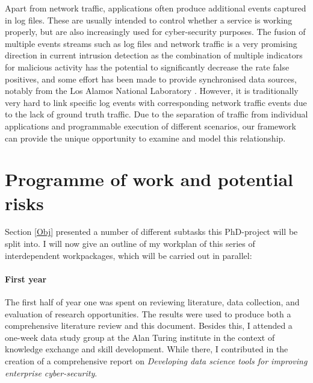 \documentclass[a4paper,12pt,twoside]{report}
\begin{document}
Apart from network traffic, applications often produce additional events captured in log files. These are usually intended to control whether a service is working properly, but are also increasingly used for cyber-security purposes. The fusion of multiple events streams such as log files and network traffic is a very promising direction in current intrusion detection as the combination of multiple indicators for malicious activity has the potential to significantly decrease the rate false positives, and some effort has been made to provide synchronised data sources, notably from the Los Alamos National Laboratory \cite{kent-2015-cyberdata1}. However, it is traditionally very hard to link specific log events with corresponding network traffic events due to the lack of ground truth traffic. Due to the separation of traffic from individual applications and programmable execution of different scenarios, our framework can provide the unique opportunity to examine and model this relationship. %


\chapter{Programme of work and potential risks}

Section \ref{Obj} presented a number of different subtasks this PhD-project will be split into. I will now give an outline of my workplan of this series of interdependent workpackages, which will be carried out in parallel:

\subsubsection{First year}

The first half of year one was spent on reviewing literature, data collection, and evaluation of research opportunities. The results were used to produce both a comprehensive literature review and this document. Besides this, I attended a one-week data study group at the Alan Turing institute in the context of knowledge exchange and skill development. While there, I contributed in the creation of a comprehensive report on \textit{Developing data science tools for improving enterprise cyber-security}.
\end{document}

